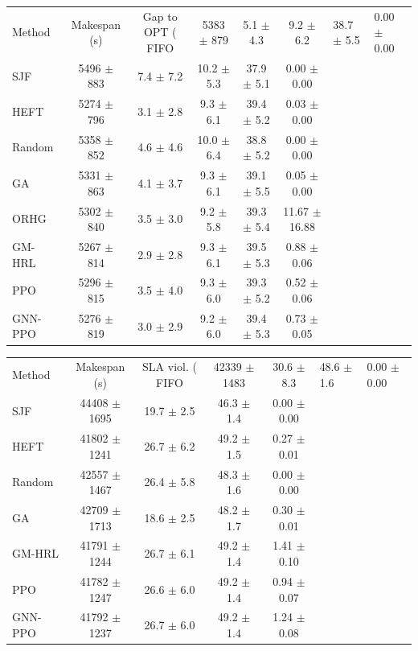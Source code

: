 \begin{tabular}{lccccc}
\toprule
Method & Makespan (s) & Gap to OPT (%
\midrule
FIFO & 5383 $\pm$ 879 & 5.1 $\pm$ 4.3 & 9.2 $\pm$ 6.2 & 38.7 $\pm$ 5.5 & 0.00 $\pm$ 0.00 \\
SJF & 5496 $\pm$ 883 & 7.4 $\pm$ 7.2 & 10.2 $\pm$ 5.3 & 37.9 $\pm$ 5.1 & 0.00 $\pm$ 0.00 \\
HEFT & 5274 $\pm$ 796 & 3.1 $\pm$ 2.8 & 9.3 $\pm$ 6.1 & 39.4 $\pm$ 5.2 & 0.03 $\pm$ 0.00 \\
Random & 5358 $\pm$ 852 & 4.6 $\pm$ 4.6 & 10.0 $\pm$ 6.4 & 38.8 $\pm$ 5.2 & 0.00 $\pm$ 0.00 \\
GA & 5331 $\pm$ 863 & 4.1 $\pm$ 3.7 & 9.3 $\pm$ 6.1 & 39.1 $\pm$ 5.5 & 0.05 $\pm$ 0.00 \\
ORHG & 5302 $\pm$ 840 & 3.5 $\pm$ 3.0 & 9.2 $\pm$ 5.8 & 39.3 $\pm$ 5.4 & 11.67 $\pm$ 16.88 \\
GM-HRL & 5267 $\pm$ 814 & 2.9 $\pm$ 2.8 & 9.3 $\pm$ 6.1 & 39.5 $\pm$ 5.3 & 0.88 $\pm$ 0.06 \\
PPO & 5296 $\pm$ 815 & 3.5 $\pm$ 4.0 & 9.3 $\pm$ 6.0 & 39.3 $\pm$ 5.2 & 0.52 $\pm$ 0.06 \\
GNN-PPO & 5276 $\pm$ 819 & 3.0 $\pm$ 2.9 & 9.2 $\pm$ 6.0 & 39.4 $\pm$ 5.3 & 0.73 $\pm$ 0.05 \\
\bottomrule
\end{tabular}

\begin{tabular}{lcccc}
\toprule
Method & Makespan (s) & SLA viol. (%
\midrule
FIFO & 42339 $\pm$ 1483 & 30.6 $\pm$ 8.3 & 48.6 $\pm$ 1.6 & 0.00 $\pm$ 0.00 \\
SJF & 44408 $\pm$ 1695 & 19.7 $\pm$ 2.5 & 46.3 $\pm$ 1.4 & 0.00 $\pm$ 0.00 \\
HEFT & 41802 $\pm$ 1241 & 26.7 $\pm$ 6.2 & 49.2 $\pm$ 1.5 & 0.27 $\pm$ 0.01 \\
Random & 42557 $\pm$ 1467 & 26.4 $\pm$ 5.8 & 48.3 $\pm$ 1.6 & 0.00 $\pm$ 0.00 \\
GA & 42709 $\pm$ 1713 & 18.6 $\pm$ 2.5 & 48.2 $\pm$ 1.7 & 0.30 $\pm$ 0.01 \\
GM-HRL & 41791 $\pm$ 1244 & 26.7 $\pm$ 6.1 & 49.2 $\pm$ 1.4 & 1.41 $\pm$ 0.10 \\
PPO & 41782 $\pm$ 1247 & 26.6 $\pm$ 6.0 & 49.2 $\pm$ 1.4 & 0.94 $\pm$ 0.07 \\
GNN-PPO & 41792 $\pm$ 1237 & 26.7 $\pm$ 6.0 & 49.2 $\pm$ 1.4 & 1.24 $\pm$ 0.08 \\
\bottomrule
\end{tabular}

